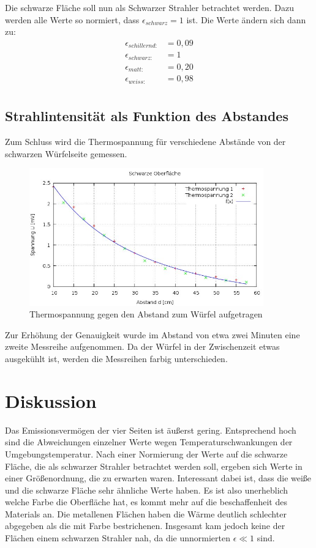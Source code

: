 Die schwarze Fläche soll nun als Schwarzer Strahler betrachtet werden. Dazu werden alle Werte so normiert, dass $\epsilon_{schwarz}=1$ ist.
Die Werte ändern sich dann zu:
\begin{align*}
\epsilon_{schillernd: }		&= 0,09      \\
\epsilon_{schwarz: }	 	&= 1         \\
\epsilon_{matt: }		 	&= 0,20      \\
\epsilon_{weiss: } 			&= 0,98      \\
\end{align*}
\subsection{Strahlintensität als Funktion des Abstandes}
Zum Schluss wird die Thermospannung für verschiedene Abstände von der schwarzen Würfelseite gemessen.

\begin{figure}[H]
\includegraphics[width=0.9\textwidth]{pics/temp_abstand.jpg}
\caption{Thermospannung gegen den Abstand zum Würfel aufgetragen}
\label{abstand}
\end{figure}

Zur Erhöhung der Genauigkeit wurde im Abstand von etwa zwei Minuten eine zweite Messreihe aufgenommen. Da der Würfel in der Zwischenzeit etwas ausgekühlt ist, werden die Messreihen farbig unterschieden.

\section{Diskussion}
Das Emissionsvermögen der vier Seiten ist äußerst gering. Entsprechend hoch sind die Abweichungen einzelner Werte wegen Temperaturschwankungen der Umgebungstemperatur. Nach einer Normierung der Werte auf die schwarze Fläche, die als schwarzer Strahler betrachtet werden soll, ergeben sich Werte in einer Größenordnung, die zu erwarten waren. Interessant dabei ist, dass die weiße und die schwarze Fläche sehr ähnliche Werte haben. Es ist also unerheblich welche Farbe die Oberfläche hat, es kommt mehr auf die beschaffenheit des Materials an. Die metallenen Flächen haben die Wärme deutlich schlechter abgegeben als die mit Farbe bestrichenen. Insgesamt kam jedoch keine der Flächen einem schwarzen Strahler nah, da die unnormierten $\epsilon \ll 1$ sind.

